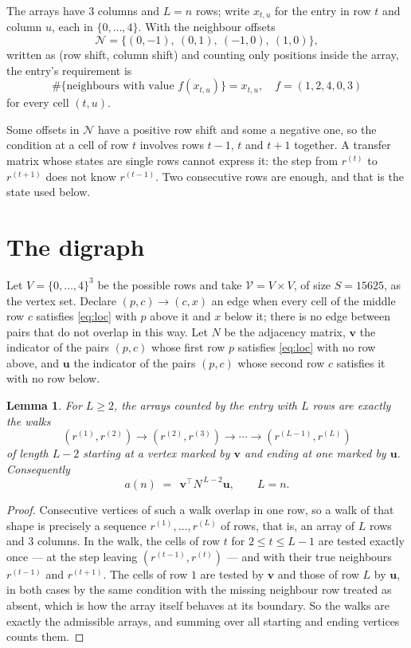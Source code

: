 \documentclass[11pt,a4paper]{article}
\theoremstyle{plain}
\newtheorem{lemma}[theorem]{Lemma}
\theoremstyle{definition}
\begin{document}
The arrays have $3$ columns and $L=n$ rows; write $x_{t,u}$ for the entry in
row $t$ and column $u$, each in $\{0,\dots,4\}$. With the neighbour offsets
\[
\mathcal N=\{(0,-1),\ (0,1),\ (-1,0),\ (1,0)\},
\]
written as (row shift, column shift) and counting only positions inside the array, the
entry's requirement is
\begin{equation}\label{eq:loc}
\#\{\text{neighbours with value }f(x_{t,u})\}=x_{t,u},\quad f=(1,2,4,0,3)
\end{equation}
for every cell $(t,u)$.

Some offsets in $\mathcal N$ have a positive row shift and some a negative one, so the
condition at a cell of row $t$ involves rows $t-1$, $t$ and $t+1$ together. A transfer
matrix whose states are single rows cannot express it: the step from $r^{(t)}$ to
$r^{(t+1)}$ does not know $r^{(t-1)}$. Two consecutive rows are enough, and that is
the state used below.

\section{The digraph}

Let $V=\{0,\dots,4\}^{3}$ be the possible rows and take
$\mathcal V=V\times V$, of size $S=15625$, as the vertex set. Declare $(p,c)\to(c,x)$ an edge
when every cell of the middle row $c$ satisfies \eqref{eq:loc} with $p$ above it and $x$
below it; there is no edge between pairs that do not overlap in this way. Let $N$ be the
adjacency matrix, $\mathbf{v}$ the indicator of the pairs $(p,c)$ whose first row $p$
satisfies \eqref{eq:loc} with no row above, and $\mathbf{u}$ the indicator of
the pairs $(p,c)$ whose second row $c$ satisfies it with no row below.

\begin{lemma}\label{lem:walk}
For $L\ge2$, the arrays counted by the entry with $L$ rows are exactly the walks
\[
(r^{(1)},r^{(2)})\to(r^{(2)},r^{(3)})\to\cdots\to(r^{(L-1)},r^{(L)})
\]
of length $L-2$ starting at a vertex marked by $\mathbf{v}$ and ending at one marked by
$\mathbf{u}$. Consequently
\[
a(n)\;=\;\,\mathbf{v}^{\!\top}N^{\,L-2}\mathbf{u},\qquad L=n .
\]
\end{lemma}

\begin{proof}
Consecutive vertices of such a walk overlap in one row, so a walk of that shape is
precisely a sequence $r^{(1)},\dots,r^{(L)}$ of rows, that is, an array of $L$ rows
and $3$ columns. In the walk, the cells of row $t$ for $2\le t\le L-1$ are tested
exactly once --- at the step leaving $(r^{(t-1)},r^{(t)})$ --- and with their true
neighbours $r^{(t-1)}$ and $r^{(t+1)}$. The cells of row $1$ are tested by
$\mathbf{v}$ and those of row $L$ by $\mathbf{u}$, in both cases by the same condition
with the missing neighbour row treated as absent, which is how the array itself behaves at
its boundary. So the walks are exactly the admissible arrays, and summing over all starting
and ending vertices counts them.
\end{proof}
\end{document}
